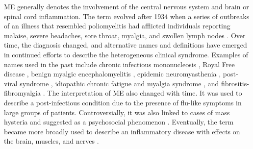 ME generally denotes the involvement of the central nervous system and brain or spinal cord inflammation.
The term evolved after 1934 when a series of outbreaks of an illness that resembled poliomyelitis had afflicted individuals reporting malaise, severe headaches, sore throat, myalgia, and swollen lymph nodes \citep[chap.~2]{instituteofmedicine2015MyalgicEncephalomyelitis}.
Over time, the diagnosis changed, and alternative names and definitions have emerged in continued efforts to describe the heterogeneous clinical syndrome.
Examples of names used in the past include chronic infectious mononucleosis \citep{isaacs1948ChronicInfectious}, Royal Free disease \citep{ramsay1956EncephalomyelitisSimulating, themedicalstaffoftheroyalfreehospital1957OutbreakEncephalomyelitis}, benign myalgic encephalomyelitis \citep{1956NewClinical, galpine1957BenignMyalgic}, epidemic neuromyasthenia \citep{henderson1959EpidemicNeuromyasthenia}, post-viral syndrome \citep{behan1985PostviralFatigue}, idiopathic chronic fatigue and myalgia syndrome \citep{byrne1988IdiopathicChronic}, and fibrositis-fibromyalgia \citep{pritchard1988FibrositisChronic, yunus1989FibromyalgiaSyndrome}.
The interpretation of ME also changed with time.
It was used to describe a post-infectious condition due to the presence of flu-like symptoms in large groups of patients.
Controversially, it was also linked to cases of mass hysteria and suggested as a psychosocial phenomenon \citep{mcevedy1970ConceptBenign}.
Eventually, the term became more broadly used to describe an inflammatory disease with effects on the brain, muscles, and nerves \citep{evengard2002ChronicFatigue, instituteofmedicine2015MyalgicEncephalomyelitis}.

